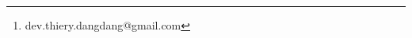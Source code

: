 \documentclass[]{settings/wi-thesis}
\begin{document}

\author{MBAIGOLMEM DANG-DANG THIERY \thanks{dev.thiery.dangdang@gmail.com}}







\maketitle
\tableofcontents
\listoffigures
\listoftables


\begin{appendix}
	
\end{appendix}

\begin{backmatter}

	\begingroup
	\setlength{\emergencystretch}{.5em}

	\printbibliography[
		heading=bibintoc,
		title={Bibliographie}
	]
	\endgroup
	\frenchDeclaration

\end{backmatter}
\end{document}
